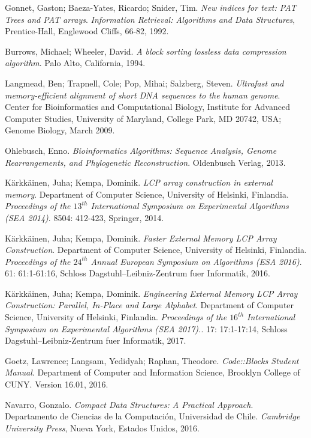 \documentclass[letterpaper, 10pt, notitlepage]{report}
\begin{document}
\begin{thebibliography}{9}
Gonnet, Gaston; Baeza-Yates, Ricardo; Snider, Tim.
\textit{New indices for text: PAT Trees and PAT arrays}.
\textit{Information Retrieval: Algorithms and Data Structures}, Prentice-Hall, Englewood Cliffs, 66-82, 1992.

Burrows, Michael; Wheeler, David.
\textit{A block sorting lossless data compression algorithm}. 
Palo Alto, California, 1994.

Langmead, Ben; Trapnell, Cole; Pop, Mihai; Salzberg, Steven.
\textit{Ultrafast and memory-efficient alignment of short DNA sequences to the human genome}. 
Center for Bioinformatics and Computational Biology, Institute for Advanced Computer Studies, University of Maryland, College Park, MD 20742, USA; Genome Biology, March 2009.

Ohlebusch, Enno.
\textit{Bioinformatics Algorithms: Sequence Analysis, Genome Rearrangements, and Phylogenetic Reconstruction}. 
Oldenbusch Verlag, 2013.

Kärkkäinen, Juha; Kempa, Dominik.
\textit{LCP array construction in external memory}.
Department of Computer Science, University of Helsinki, Finlandia.
\textit{Proceedings of the $13^{th}$ International Symposium on Experimental Algorithms (SEA 2014)}.
8504: 412-423, Springer, 2014.

Kärkkäinen, Juha; Kempa, Dominik.
\textit{Faster External Memory LCP Array Construction}.
Department of Computer Science, University of Helsinki, Finlandia.
\textit{Proceedings of the $24^{th}$ Annual European Symposium on Algorithms (ESA 2016)}.
61: 61:1-61:16, Schloss Dagstuhl–Leibniz-Zentrum fuer Informatik, 2016.

Kärkkäinen, Juha; Kempa, Dominik.
\textit{Engineering External Memory LCP Array Construction: Parallel, In-Place and Large Alphabet}.
Department of Computer Science, University of Helsinki, Finlandia.
\textit{Proceedings of the $16^{th}$ International Symposium on Experimental Algorithms (SEA 2017).}.
17: 17:1-17:14, Schloss Dagstuhl–Leibniz-Zentrum fuer Informatik, 2017.

Goetz, Lawrence; Langsam, Yedidyah; Raphan, Theodore.
\textit{Code::Blocks Student Manual}.
Department of Computer and Information Science, Brooklyn College of CUNY.
Version 16.01, 2016.

Navarro, Gonzalo.
\textit{Compact Data Structures: A Practical Approach}.
Departamento de Ciencias de la Computación, Universidad de Chile.
\textit{Cambridge University Press}, Nueva York, Estados Unidos, 2016.


\end{thebibliography}
\end{document}
